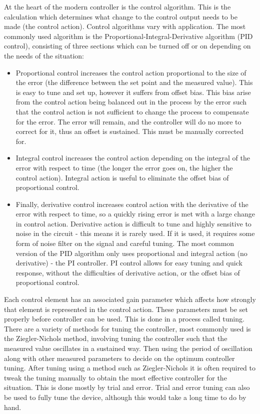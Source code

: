 \documentclass[twoside,a4]{report}
\def\br{\newline \newline \noindent}
\begin{document}
	At the heart of the modern controller is the control algorithm. This is the calculation which determines what change to the control output needs to be made (the control action). Control algorithms vary with application. The most commonly used algorithm is the Proportional-Integral-Derivative algorithm (PID control), consisting of three sections which can be turned off or on depending on the needs of the situation:
	\begin{itemize}
		\item Proportional control increases the control action proportional to the size of the error (the difference between the set point and the measured value). This is easy to tune and set up, however it suffers from offset bias. This bias arise from the control action being balanced out in the process by the error such that the control action is not sufficient to change the process to compensate for the error. The error will remain, and the controller will do no more to correct for it, thus an offset is sustained. This must be manually corrected for.
		\item Integral control increases the control action depending on the integral of the error with respect to time (the longer the error goes on, the higher the control action). Integral action is useful to eliminate the offset bias of proportional control.
		\item Finally, derivative control increases control action with the derivative of the error with respect to time, so a quickly rising error is met with a large change in control action. Derivative action is difficult to tune and highly sensitive to noise in the circuit - this means it is rarely used. If it is used, it requires some form of noise filter on the signal and careful tuning. The most common version of the PID algorithm only uses proportional and integral action (no derivative) - the PI controller. PI control allows for easy tuning and quick response, without the difficulties of derivative action, or the offset bias of proportional control.
	\end{itemize}
	Each control element has an associated gain parameter which affects how strongly that element is represented in the control action. These parameters must be set properly before controller can be used. This is done in a process called tuning. There are a variety of methods for tuning the controller, most commonly used is the Ziegler-Nichols method, involving tuning the controller such that the measured value oscillates in a sustained way. Then using the period of oscillation along with other measured parameters to decide on the optimum controller tuning. After tuning using a method such as Ziegler-Nichols it is often required to tweak the tuning manually to obtain the most effective controller for the situation. This is done mostly by trial and error. Trial and error tuning can also be used to fully tune the device, although this would take a long time to do by hand. \br
\end{document}
